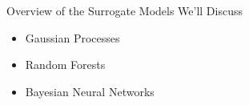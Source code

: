 \begin{frame}[c]{Overview of the Surrogate Models We'll Discuss}

\begin{itemize}
	\item Gaussian Processes 
	\item Random Forests 
	\item Bayesian Neural Networks 

\end{itemize}

%
%
%
%
%  
%
%


\end{frame}
